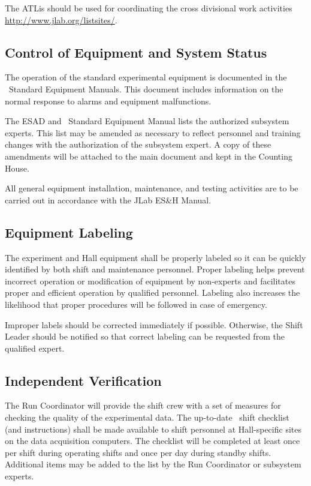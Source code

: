 \documentclass[11pt]{article}
\begin{document}
The ATLis should be used for coordinating the cross divisional work activities
\url{http://www.jlab.org/listsites/}. 

\subsection{Control of Equipment and System Status}
\indent

The operation of the standard experimental equipment is documented in the 
\HALL\ Standard Equipment Manuals.
This document includes information on the
normal response to alarms and equipment malfunctions.
 
The ESAD and \HALL\ Standard Equipment Manual lists 
the authorized subsystem experts. This list may be amended as necessary to 
reflect personnel and training changes with the 
authorization of the subsystem expert. A copy of these 
amendments will be attached to the main document and kept in the
Counting House.

All general equipment installation, maintenance, and testing activities 
are to be carried out in accordance with the JLab ES\&H Manual.

\subsection{Equipment Labeling}
\indent

The experiment and Hall equipment shall be properly labeled so 
it can be quickly identified by both shift and maintenance personnel.
Proper labeling helps prevent incorrect operation or modification of
equipment by non-experts and facilitates proper and efficient operation by
qualified personnel. Labeling also increases the likelihood that 
proper procedures will be followed in case of emergency.

Improper labels should be corrected immediately if possible.
Otherwise, the Shift Leader should be notified so that correct 
labeling can be requested from the qualified expert.


\subsection{Independent Verification}
\indent
	
The Run Coordinator will provide the shift crew with a set of 
measures for checking the quality of the experimental data.  
The up-to-date \HALL\ shift 
checklist (and instructions) shall be made available to shift personnel
at Hall-specific sites on the data acquisition  computers.
The checklist will be completed at least once per shift during operating 
shifts and once per day during standby shifts. Additional items may be 
added to the list by the Run Coordinator or subsystem experts.
\end{document}
